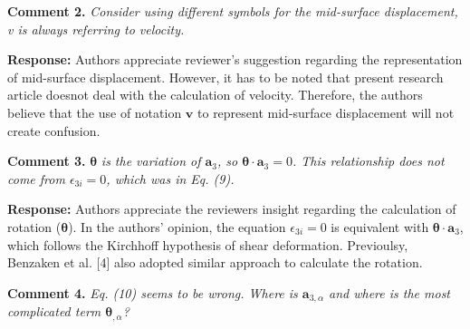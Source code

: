 \documentclass{article}
\begin{document}
\textbf{Comment 2.} \textit{Consider using different symbols for the mid-surface displacement, v is always referring to velocity.}

\textbf{Response:} Authors appreciate reviewer's suggestion regarding the representation of mid-surface displacement. However, it has to be noted that present research article doesnot deal with the calculation of velocity. Therefore, the authors believe that the use of notation $\boldsymbol v$ to represent mid-surface displacement will not create confusion. 

\textbf{Comment 3.} $\boldsymbol \theta$ \textit{is the variation of $\boldsymbol a_3$, so $\boldsymbol \theta \cdot \boldsymbol a_3=0$. This relationship does not come from $\epsilon_{3i} = 0$, which was in Eq. (9).}

\textbf{Response:} Authors appreciate the reviewers insight regarding the calculation of rotation ($\boldsymbol \theta$). In the authors' opinion, the equation $\epsilon_{3i}=0$ is equivalent with $\boldsymbol \theta \cdot \boldsymbol a_3$, which follows the Kirchhoff hypothesis of shear deformation. Previoulsy, Benzaken et al. [4] also adopted similar approach to calculate the rotation. 

\textbf{Comment 4.} \textit{Eq. (10) seems to be wrong. Where is $\boldsymbol a_{3,\alpha}$ and where is the most complicated term $\boldsymbol \theta_{,\alpha}$?}
\end{document}
